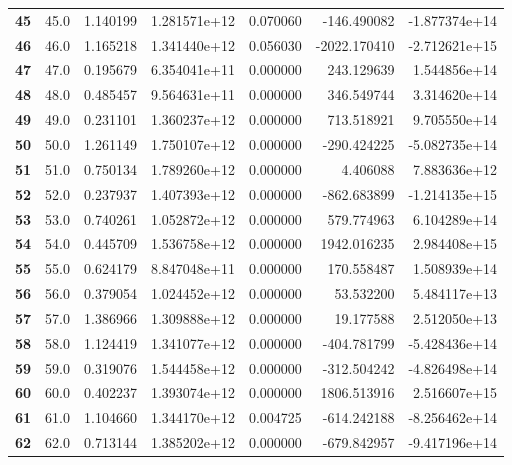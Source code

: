 \documentclass{report}[12pt]
\begin{document}
\begin{center}
\begin{tabular}{lrrrrrr}
\textbf{45  } &           45.0 &   1.140199 &  1.281571e+12 &    0.070060 &  -146.490082 & -1.877374e+14 \\
\textbf{46  } &           46.0 &   1.165218 &  1.341440e+12 &    0.056030 & -2022.170410 & -2.712621e+15 \\
\textbf{47  } &           47.0 &   0.195679 &  6.354041e+11 &    0.000000 &   243.129639 &  1.544856e+14 \\
\textbf{48  } &           48.0 &   0.485457 &  9.564631e+11 &    0.000000 &   346.549744 &  3.314620e+14 \\
\textbf{49  } &           49.0 &   0.231101 &  1.360237e+12 &    0.000000 &   713.518921 &  9.705550e+14 \\
\textbf{50  } &           50.0 &   1.261149 &  1.750107e+12 &    0.000000 &  -290.424225 & -5.082735e+14 \\
\textbf{51  } &           51.0 &   0.750134 &  1.789260e+12 &    0.000000 &     4.406088 &  7.883636e+12 \\
\textbf{52  } &           52.0 &   0.237937 &  1.407393e+12 &    0.000000 &  -862.683899 & -1.214135e+15 \\
\textbf{53  } &           53.0 &   0.740261 &  1.052872e+12 &    0.000000 &   579.774963 &  6.104289e+14 \\
\textbf{54  } &           54.0 &   0.445709 &  1.536758e+12 &    0.000000 &  1942.016235 &  2.984408e+15 \\
\textbf{55  } &           55.0 &   0.624179 &  8.847048e+11 &    0.000000 &   170.558487 &  1.508939e+14 \\
\textbf{56  } &           56.0 &   0.379054 &  1.024452e+12 &    0.000000 &    53.532200 &  5.484117e+13 \\
\textbf{57  } &           57.0 &   1.386966 &  1.309888e+12 &    0.000000 &    19.177588 &  2.512050e+13 \\
\textbf{58  } &           58.0 &   1.124419 &  1.341077e+12 &    0.000000 &  -404.781799 & -5.428436e+14 \\
\textbf{59  } &           59.0 &   0.319076 &  1.544458e+12 &    0.000000 &  -312.504242 & -4.826498e+14 \\
\textbf{60  } &           60.0 &   0.402237 &  1.393074e+12 &    0.000000 &  1806.513916 &  2.516607e+15 \\
\textbf{61  } &           61.0 &   1.104660 &  1.344170e+12 &    0.004725 &  -614.242188 & -8.256462e+14 \\
\textbf{62  } &           62.0 &   0.713144 &  1.385202e+12 &    0.000000 &  -679.842957 & -9.417196e+14 \\

\end{tabular}
\end{center}
\end{document}
